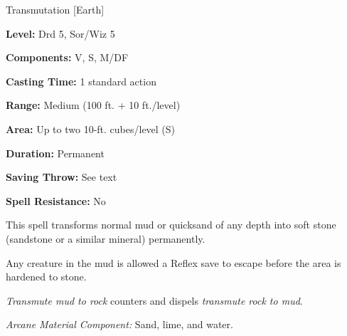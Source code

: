 
Transmutation [Earth]

\textbf{Level:} Drd 5, Sor/Wiz 5

\textbf{Components:} V, S, M/DF

\textbf{Casting Time:} 1 standard action

\textbf{Range:} Medium (100 ft. + 10 ft./level)

\textbf{Area:} Up to two 10-ft. cubes/level (S)

\textbf{Duration:} Permanent

\textbf{Saving Throw:} See text

\textbf{Spell Resistance:} No

This spell transforms normal mud or quicksand of any depth into soft stone (sandstone 
or a similar mineral) permanently.

Any creature in the mud is allowed a Reflex save to escape before the area is hardened 
to stone.

\textit{Transmute mud to rock} counters and dispels \textit{transmute rock to mud}.

\textit{Arcane Material Component:} Sand, lime, and water.

